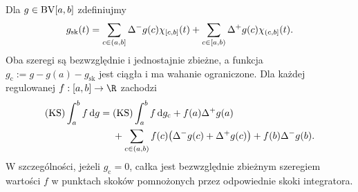 \begin{twierdzenie}
\label{tw:ks-bv-split}
Dla $g\in\mathrm{BV}[a,b]$ zdefiniujmy
\[
 g_{\mathrm{sk}}(t)=
 \sum_{c\in(a,b]}\Delta^-g(c)\chi_{[c,b]}(t)
 +\sum_{c\in[a,b)}\Delta^+g(c)\chi_{(c,b]}(t).
\]
Oba szeregi są bezwzględnie i jednostajnie zbieżne, a funkcja $g_{\mathrm c}:=g-g(a)-g_{\mathrm{sk}}$ jest ciągła i ma wahanie ograniczone. Dla każdej regulowanej $f:[a,b]\to\R$ zachodzi
\[
 \begin{aligned}
 (\mathrm{KS})\int_a^b f\,\mathrm dg
 ={}&(\mathrm{KS})\int_a^b f\,\mathrm dg_{\mathrm c}
 +f(a)\Delta^+g(a)\\
 &+\sum_{c\in(a,b)}f(c)\bigl(\Delta^-g(c)+\Delta^+g(c)\bigr)
 +f(b)\Delta^-g(b).
 \end{aligned}
\]
W szczególności, jeżeli $g_{\mathrm c}=0$, całka jest
bezwzględnie zbieżnym szeregiem wartości $f$ w punktach
skoków pomnożonych przez odpowiednie skoki integratora.
\end{twierdzenie}

